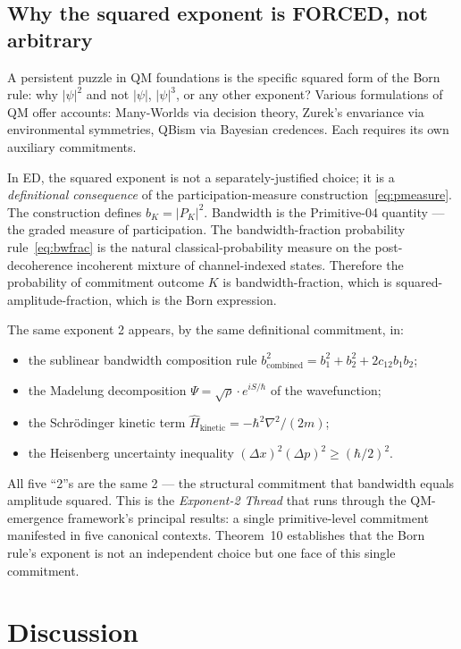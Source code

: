 \documentclass[11pt,a4paper]{article}
\begin{document}
\subsection{Why the squared exponent is FORCED, not arbitrary}

A persistent puzzle in QM foundations is the specific squared form of the Born rule: why $|\psi|^2$ and not $|\psi|$, $|\psi|^3$, or any other exponent? Various formulations of QM offer accounts: Many-Worlds via decision theory, Zurek's envariance via environmental symmetries, QBism via Bayesian credences. Each requires its own auxiliary commitments.

In ED, the squared exponent is not a separately-justified choice; it is a \emph{definitional consequence} of the participation-measure construction~\eqref{eq:pmeasure}. The construction defines $b_K = |P_K|^2$. Bandwidth is the Primitive-04 quantity --- the graded measure of participation. The bandwidth-fraction probability rule~\eqref{eq:bwfrac} is the natural classical-probability measure on the post-decoherence incoherent mixture of channel-indexed states. Therefore the probability of commitment outcome $K$ is bandwidth-fraction, which is squared-amplitude-fraction, which is the Born expression.

The same exponent 2 appears, by the same definitional commitment, in:
\begin{itemize}
  \item the sublinear bandwidth composition rule $b_\mathrm{combined}^2 = b_1^2 + b_2^2 + 2 c_{12} b_1 b_2$;
  \item the Madelung decomposition $\Psi = \sqrt{\rho} \cdot e^{i S / \hbar}$ of the wavefunction;
  \item the Schr\"odinger kinetic term $\hat{H}_\mathrm{kinetic} = -\hbar^2 \nabla^2 / (2m)$;
  \item the Heisenberg uncertainty inequality $(\Delta x)^2 (\Delta p)^2 \geq (\hbar/2)^2$.
\end{itemize}
All five ``2''s are the same 2 --- the structural commitment that bandwidth equals amplitude squared. This is the \emph{Exponent-2 Thread} that runs through the QM-emergence framework's principal results: a single primitive-level commitment manifested in five canonical contexts. Theorem~10 establishes that the Born rule's exponent is not an independent choice but one face of this single commitment.

\section{Discussion}\label{sec:discussion}
\end{document}
